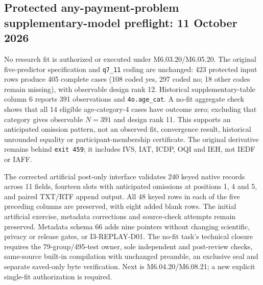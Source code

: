 \documentclass[11pt,a4paper]{article}
\begin{document}
\subsection*{Protected any-payment-problem supplementary-model preflight: 11 October 2026}
No research fit is authorized or executed under M6.03.20/M6.05.20. The original five-predictor specification and \texttt{q7\_11} coding are unchanged: 423 protected input rows produce 405 complete cases (108 coded yes, 297 coded no; 18 other codes remain missing), with observable design rank 12. Historical supplementary-table column 6 reports 391 observations and \texttt{4o.age\_cat}. A no-fit aggregate check shows that all 14 eligible age-category-4 cases have outcome zero; excluding that category gives observable $N=391$ and design rank 11. This supports an anticipated omission pattern, not an observed fit, convergence result, historical unrounded equality or participant-membership certificate. The original derivative remains behind \texttt{exit 459}; it includes IVS, IAT, ICDP, OQI and IEH, not IEDF or IAFF.

The corrected artificial post-only interface validates 240 keyed native records across 11 fields, fourteen slots with anticipated omissions at positions 1, 4 and 5, and paired TXT/RTF append output. All 48 keyed rows in each of the five preceding columns are preserved, with eight added blank rows. The initial artificial exercise, metadata corrections and source-check attempts remain preserved. Metadata schema 66 adds nine pointers without changing scientific, privacy or release gates, or I3-REPLAY-D01. The no-fit task's technical closure requires the 79-group/495-test owner, sole independent and post-review checks, same-source built-in compilation with unchanged preamble, an exclusive seal and separate saved-only byte verification. Next is M6.04.20/M6.08.21; a new explicit single-fit authorization is required.
\end{document}
